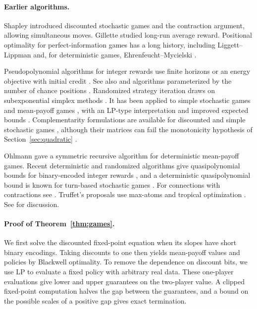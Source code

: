 \paragraph{Earlier algorithms.}
Shapley \cite{Shap} introduced discounted stochastic games and the
contraction argument, allowing simultaneous moves. Gillette \cite{Gillet}
studied long-run average reward. Positional optimality for
perfect-information games has a long history, including
Liggett--Lippman \cite{LL} and, for deterministic games,
Ehrenfeucht--Mycielski \cite{EM}.

Pseudopolynomial algorithms for integer rewards use finite horizons
\cite{ZP} or an energy objective with initial credit \cite{BC}.
See also \cite{GKK,Puri} and algorithms parameterized by the number
of chance positions \cite{BEGM,AGKS}. Randomized strategy iteration
draws on subexponential simplex methods \cite{Kalai,MSW,HZ}. It has
been applied to simple stochastic games \cite{Lud} and mean-payoff
games \cite{BSV,BV}, with an LP-type interpretation \cite{Hal} and
improved expected bounds \cite{Uz}. Complementarity formulations are
available for discounted and simple stochastic games
\cite{JSav,HIJ,GR}, although their matrices can fail the monotonicity
hypothesis of Section~\ref{sec:quadratic} \cite[Theorem~23]{HIJ}.

Ohlmann \cite{Ohl} gave a symmetric recursive algorithm for
deterministic mean-payoff games. Recent deterministic and randomized
algorithms give quasipolynomial bounds for binary-encoded integer
rewards \cite{OAIDe,OAIRa}, and a deterministic quasipolynomial
bound is known for turn-based stochastic games \cite{OAITu}. For
connections with contractions see \cite{SF}. Truffet's proposals
use max-atoms and tropical optimization \cite{Tru1,Tru2}. See
\cite[Section~1 and Appendix~A]{OAIRa} for discussion.

\paragraph{Proof of Theorem~\ref{thm:games}.}
We first solve the discounted fixed-point equation when its slopes
have short binary encodings. Taking discounts to one then yields
mean-payoff values and policies by Blackwell optimality. To remove
the dependence on discount bits, we use LP to evaluate a fixed policy
with arbitrary real data. These one-player evaluations give lower and
upper guarantees on the two-player value. A clipped fixed-point
computation halves the gap between the guarantees, and a bound on
the possible scales of a positive gap gives exact termination.

